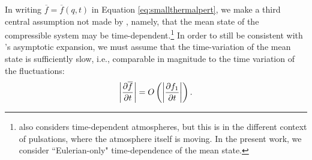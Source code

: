 \documentclass[12pt]{article}
\begin{document}

	In writing $\overline{f}=\overline{f}(q,t)$ in Equation \eqref{eq:smallthermalpert}, we make a third central assumption not made by \citet{Gough1969}, namely, that the mean state of the compressible system may be time-dependent.\footnote{\citet{Gough1969} also considers time-dependent atmospheres, but this is in the different context of pulsations, where the atmosphere itself is moving. In the present work, we consider ``Eulerian-only" time-dependence of the mean state.} In order to still be consistent with \citet{Gough1969}'s asymptotic expansion, we must assume that the time-variation of the mean state is sufficiently slow, i.e., comparable in magnitude to the time variation of the fluctuations:
\begin{align}\label{eq:meanvariationslow}
	\left|\frac{\partial\overline{f}}{\partial t}\right| = O\left(\left|\frac{\partial f_1}{\partial t}\right|\right).
\end{align}
\end{document}
